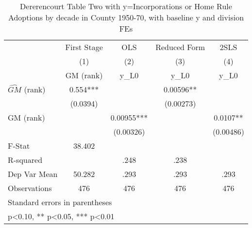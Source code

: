 \begin{table}[htbp]\centering
\def\sym#1{\ifmmode^{#1}\else\(^{#1}\)\fi}
\caption{Dererencourt Table Two with y=Incorporations or Home Rule Adoptions by decade in County 1950-70, with baseline y and division FEs}
\begin{tabular}{l*{4}{c}}
\toprule
                    & First Stage   &         OLS   &Reduced Form   &        2SLS   \\
                    &\multicolumn{1}{c}{(1)}&\multicolumn{1}{c}{(2)}&\multicolumn{1}{c}{(3)}&\multicolumn{1}{c}{(4)}\\
                    &\multicolumn{1}{c}{GM  (rank)}&\multicolumn{1}{c}{y\_L0}&\multicolumn{1}{c}{y\_L0}&\multicolumn{1}{c}{y\_L0}\\
\midrule
$\hat{GM}$ (rank)   &       0.554***&               &     0.00596** &               \\
                    &    (0.0394)   &               &   (0.00273)   &               \\
\addlinespace
GM  (rank)          &               &     0.00955***&               &      0.0107** \\
                    &               &   (0.00326)   &               &   (0.00486)   \\
\midrule
F-Stat              &      38.402   &               &               &               \\
R-squared           &               &        .248   &        .238   &               \\
Dep Var Mean        &      50.282   &        .293   &        .293   &        .293   \\
Observations        &         476   &         476   &         476   &         476   \\
\bottomrule
\multicolumn{5}{l}{\footnotesize Standard errors in parentheses}\\
\multicolumn{5}{l}{\footnotesize * p<0.10, ** p<0.05, *** p<0.01}\\
\end{tabular}
\end{table}
